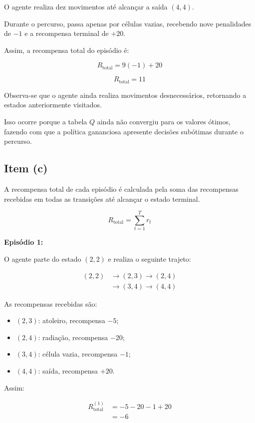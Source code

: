 O agente realiza dez movimentos até
alcançar a saída $(4,4)$.

Durante o percurso, passa apenas por
células vazias, recebendo nove
penalidades de $-1$ e a recompensa
terminal de $+20$.

Assim, a recompensa total do episódio é:

\[
R_{\text{total}}=9(-1)+20
\]

\[
\boxed{R_{\text{total}}=11}
\]

Observa-se que o agente ainda realiza
movimentos desnecessários, retornando
a estados anteriormente visitados.

Isso ocorre porque a tabela $Q$
ainda não convergiu para os valores
ótimos, fazendo com que a política
gananciosa apresente decisões
subótimas durante o percurso.


\subsection{Item (c)}

A recompensa total de cada episódio é
calculada pela soma das recompensas
recebidas em todas as transições
até alcançar o estado terminal.

\[
R_{\text{total}}=\sum_{t=1}^{T}r_t
\]

\textbf{Episódio 1:}

O agente parte do estado $(2,2)$
e realiza o seguinte trajeto:

\[
\begin{aligned}
(2,2)&\rightarrow(2,3)\rightarrow(2,4)\\
&\rightarrow(3,4)\rightarrow(4,4)
\end{aligned}
\]

As recompensas recebidas são:

\begin{itemize}
    \item $(2,3)$: atoleiro, recompensa $-5$;
    \item $(2,4)$: radiação, recompensa $-20$;
    \item $(3,4)$: célula vazia, recompensa $-1$;
    \item $(4,4)$: saída, recompensa $+20$.
\end{itemize}

Assim:

\[
\begin{aligned}
R_{\text{total}}^{(1)}
&=-5-20-1+20\\
&=-6
\end{aligned}
\]


